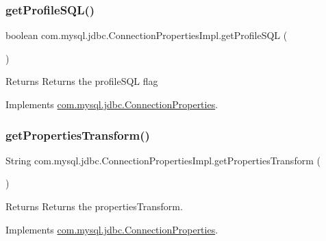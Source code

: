 \subsubsection{\texorpdfstring{get\+Profile\+S\+Q\+L()}{getProfileSQL()}}
{\footnotesize\ttfamily boolean com.\+mysql.\+jdbc.\+Connection\+Properties\+Impl.\+get\+Profile\+S\+QL (\begin{DoxyParamCaption}{ }\end{DoxyParamCaption})}

\begin{DoxyReturn}{Returns}
Returns the profile\+S\+QL flag 
\end{DoxyReturn}


Implements \mbox{\hyperlink{interfacecom_1_1mysql_1_1jdbc_1_1_connection_properties_af0e1c9e18770d1c2478851ab1dcd1d70}{com.\+mysql.\+jdbc.\+Connection\+Properties}}.

\mbox{\label{classcom_1_1mysql_1_1jdbc_1_1_connection_properties_impl_a4eb7aa6de496a4aa67a85509de9f46a7}} 
\subsubsection{\texorpdfstring{get\+Properties\+Transform()}{getPropertiesTransform()}}
{\footnotesize\ttfamily String com.\+mysql.\+jdbc.\+Connection\+Properties\+Impl.\+get\+Properties\+Transform (\begin{DoxyParamCaption}{ }\end{DoxyParamCaption})}

\begin{DoxyReturn}{Returns}
Returns the properties\+Transform. 
\end{DoxyReturn}


Implements \mbox{\hyperlink{interfacecom_1_1mysql_1_1jdbc_1_1_connection_properties_a0d177b2a7b7de4fc521d3362343375de}{com.\+mysql.\+jdbc.\+Connection\+Properties}}.

\mbox{\label{classcom_1_1mysql_1_1jdbc_1_1_connection_properties_impl_a4edd40bce78479f65769de2f31a13efc}} 
